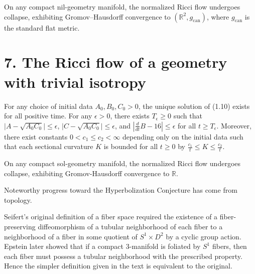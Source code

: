 \begin{corollary}
\label{ch01-cor-nil-collapse}

On any compact nil-geometry manifold, the normalized Ricci flow undergoes collapse, exhibiting Gromov--Hausdorff convergence to $(\mathbb{R}^2,g_{\mathrm{can}})$, where $g_{\mathrm{can}}$ is the standard flat metric.
\end{corollary}

\section*{7. The Ricci flow of a geometry with trivial isotropy}

\begin{proposition}
\label{ch01-prop-sol}

For any choice of initial data $A_0, B_0, C_0 > 0$, the unique solution of (1.10) exists for all positive time. For any $\epsilon > 0$, there exists $T_\epsilon \ge 0$ such that $\lvert A - \sqrt{A_0C_0} \rvert \le \epsilon$, $\lvert C - \sqrt{A_0C_0} \rvert \le \epsilon$, and $\left\lvert \frac{d}{dt} B - 16 \right\rvert \le \epsilon$ for all $t \ge T_\epsilon$. Moreover, there exist constants $0 < c_1 \le c_2 < \infty$ depending only on the initial data such that each sectional curvature $K$ is bounded for all $t \ge 0$ by $\frac{c_1}{t} \le K \le \frac{c_2}{t}$.
\end{proposition}

\begin{corollary}
\label{ch01-cor-sol-collapse}

On any compact sol-geometry manifold, the normalized Ricci flow undergoes collapse, exhibiting Gromov-Hausdorff convergence to $\mathbb{R}$.
\end{corollary}

\begin{remark}
\label{ch01-rem-hyperbolization-progress}
Noteworthy progress toward the Hyperbolization Conjecture has come from topology.
\end{remark}

\begin{remark}
\label{ch01-rem-seifert-equivalence}
Seifert's original definition of a fiber space required the existence of a fiber-preserving diffeomorphism of a tubular neighborhood of each fiber to a neighborhood of a fiber in some quotient of $S^1 \times D^2$ by a cyclic group action. Epstein later showed that if a compact $3$-manifold is foliated by $S^1$ fibers, then each fiber must possess a tubular neighborhood with the prescribed property. Hence the simpler definition given in the text is equivalent to the original.
\end{remark}

